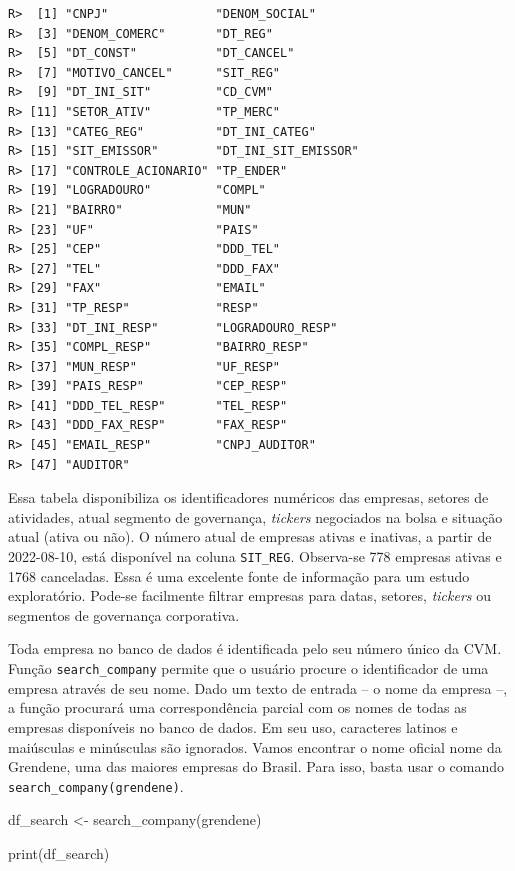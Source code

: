 \documentclass[
  11pt,
]{book}
\newenvironment{Shaded}{\begin{snugshade}}{\end{snugshade}}
\newcommand{\FunctionTok}[1]{\textcolor[rgb]{0,0,0}{#1}}
\newcommand{\NormalTok}[1]{#1}
\newcommand{\OtherTok}[1]{\textcolor[rgb]{0.37,0.37,0.37}{#1}}
\newcommand{\StringTok}[1]{\textcolor[rgb]{0.5,0.5,0.5}{#1}}
\begin{document}
\begin{verbatim}
R>  [1] "CNPJ"               "DENOM_SOCIAL"      
R>  [3] "DENOM_COMERC"       "DT_REG"            
R>  [5] "DT_CONST"           "DT_CANCEL"         
R>  [7] "MOTIVO_CANCEL"      "SIT_REG"           
R>  [9] "DT_INI_SIT"         "CD_CVM"            
R> [11] "SETOR_ATIV"         "TP_MERC"           
R> [13] "CATEG_REG"          "DT_INI_CATEG"      
R> [15] "SIT_EMISSOR"        "DT_INI_SIT_EMISSOR"
R> [17] "CONTROLE_ACIONARIO" "TP_ENDER"          
R> [19] "LOGRADOURO"         "COMPL"             
R> [21] "BAIRRO"             "MUN"               
R> [23] "UF"                 "PAIS"              
R> [25] "CEP"                "DDD_TEL"           
R> [27] "TEL"                "DDD_FAX"           
R> [29] "FAX"                "EMAIL"             
R> [31] "TP_RESP"            "RESP"              
R> [33] "DT_INI_RESP"        "LOGRADOURO_RESP"   
R> [35] "COMPL_RESP"         "BAIRRO_RESP"       
R> [37] "MUN_RESP"           "UF_RESP"           
R> [39] "PAIS_RESP"          "CEP_RESP"          
R> [41] "DDD_TEL_RESP"       "TEL_RESP"          
R> [43] "DDD_FAX_RESP"       "FAX_RESP"          
R> [45] "EMAIL_RESP"         "CNPJ_AUDITOR"      
R> [47] "AUDITOR"
\end{verbatim}

Essa tabela disponibiliza os identificadores numéricos das empresas, setores de atividades, atual segmento de governança, \emph{tickers} negociados na bolsa e situação atual (ativa ou não). O número atual de empresas ativas e inativas, a partir de 2022-08-10, está disponível na coluna \texttt{SIT\_REG}. Observa-se 778 empresas ativas e 1768 canceladas. Essa é uma excelente fonte de informação para um estudo exploratório. Pode-se facilmente filtrar empresas para datas, setores, \emph{tickers} ou segmentos de governança corporativa.

Toda empresa no banco de dados é identificada pelo seu número único da CVM. Função \texttt{search\_company} permite que o usuário procure o identificador de uma empresa através de seu nome. Dado um texto de entrada -- o nome da empresa --, a função procurará uma correspondência parcial com os nomes de todas as empresas disponíveis no banco de dados. Em seu uso, caracteres latinos e maiúsculas e minúsculas são ignorados. Vamos encontrar o nome oficial nome da Grendene, uma das maiores empresas do Brasil. Para isso, basta usar o comando \texttt{search\_company(\textquotesingle{}grendene\textquotesingle{})}.

\begin{Shaded}
\begin{Highlighting}[]
\NormalTok{df\_search }\OtherTok{\textless{}{-}} \FunctionTok{search\_company}\NormalTok{(}\StringTok{\textquotesingle{}grendene\textquotesingle{}}\NormalTok{)}

\FunctionTok{print}\NormalTok{(df\_search)}
\end{Highlighting}
\end{Shaded}
\end{document}
